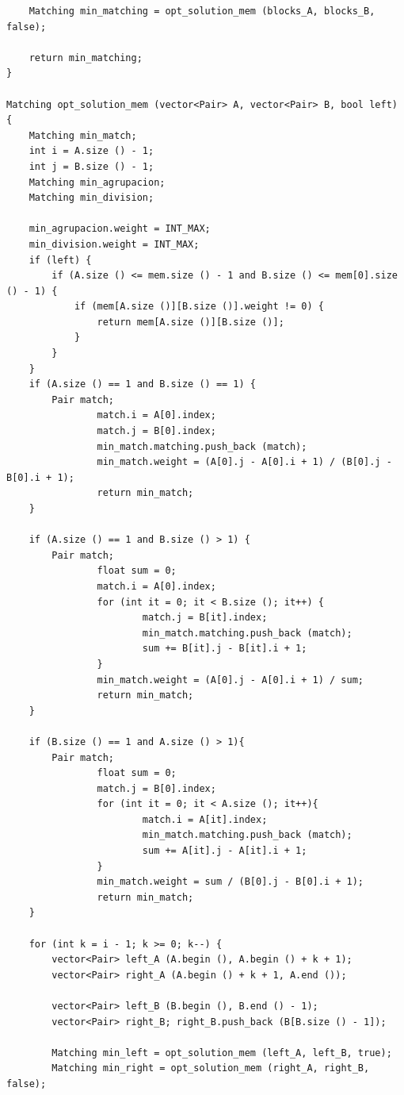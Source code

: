 \documentclass{article}
\begin{document}
\begin{lstlisting}
    Matching min_matching = opt_solution_mem (blocks_A, blocks_B, false);

    return min_matching;
}

Matching opt_solution_mem (vector<Pair> A, vector<Pair> B, bool left) {
    Matching min_match;
    int i = A.size () - 1;
    int j = B.size () - 1;
    Matching min_agrupacion;
    Matching min_division;

    min_agrupacion.weight = INT_MAX;
    min_division.weight = INT_MAX;
    if (left) {
        if (A.size () <= mem.size () - 1 and B.size () <= mem[0].size () - 1) {
            if (mem[A.size ()][B.size ()].weight != 0) {
                return mem[A.size ()][B.size ()];
            }
        }
    }
    if (A.size () == 1 and B.size () == 1) {
        Pair match;
                match.i = A[0].index;
                match.j = B[0].index;
                min_match.matching.push_back (match);
                min_match.weight = (A[0].j - A[0].i + 1) / (B[0].j - B[0].i + 1);
                return min_match;
    }

    if (A.size () == 1 and B.size () > 1) {
        Pair match;
                float sum = 0;
                match.i = A[0].index;
                for (int it = 0; it < B.size (); it++) {
                        match.j = B[it].index;
                        min_match.matching.push_back (match);
                        sum += B[it].j - B[it].i + 1;
                }
                min_match.weight = (A[0].j - A[0].i + 1) / sum;
                return min_match;
    }

    if (B.size () == 1 and A.size () > 1){
        Pair match;
                float sum = 0;
                match.j = B[0].index;
                for (int it = 0; it < A.size (); it++){
                        match.i = A[it].index;
                        min_match.matching.push_back (match);
                        sum += A[it].j - A[it].i + 1;
                }
                min_match.weight = sum / (B[0].j - B[0].i + 1);
                return min_match;
    }

    for (int k = i - 1; k >= 0; k--) {
        vector<Pair> left_A (A.begin (), A.begin () + k + 1);
        vector<Pair> right_A (A.begin () + k + 1, A.end ());

        vector<Pair> left_B (B.begin (), B.end () - 1);
        vector<Pair> right_B; right_B.push_back (B[B.size () - 1]);

        Matching min_left = opt_solution_mem (left_A, left_B, true);
        Matching min_right = opt_solution_mem (right_A, right_B, false);


\end{lstlisting}
\end{document}
